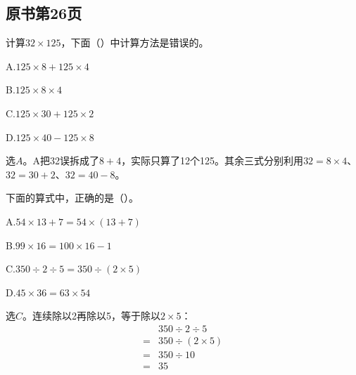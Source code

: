 
\subsection*{原书第26页}

计算\(32\times125\)，下面（\hspace{1.8em}）中计算方法是错误的。\par
\noindent A.\(125\times8+125\times4\)\par
\noindent B.\(125\times8\times4\)\par
\noindent C.\(125\times30+125\times2\)\par
\noindent D.\(125\times40-125\times8\)\par
\begin{BookAnswer}
选\(A\)。A把32误拆成了\(8+4\)，实际只算了12个125。其余三式分别利用\(32=8\times4\)、\(32=30+2\)、\(32=40-8\)。
\end{BookAnswer}

下面的算式中，正确的是（\hspace{1.8em}）。\par
\noindent A.\(54\times13+7=54\times(13+7)\)\par
\noindent B.\(99\times16=100\times16-1\)\par
\noindent C.\(350\div2\div5=350\div(2\times5)\)\par
\noindent D.\(45\times36=63\times54\)\par
\begin{BookAnswer}
选\(C\)。连续除以2再除以5，等于除以\(2\times5\)：\[\begin{aligned} &350\div2\div5\\={}&350\div(2\times5)\\={}&350\div10\\={}&35\end{aligned}\]
\end{BookAnswer}

